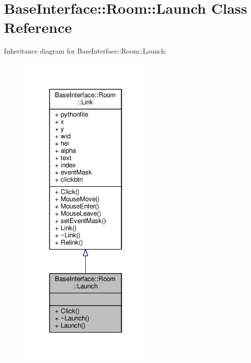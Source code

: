 \hypertarget{classBaseInterface_1_1Room_1_1Launch}{}\section{Base\+Interface\+:\+:Room\+:\+:Launch Class Reference}
\label{classBaseInterface_1_1Room_1_1Launch}


Inheritance diagram for Base\+Interface\+:\+:Room\+:\+:Launch\+:
\nopagebreak
\begin{figure}[H]
\begin{center}
\leavevmode
\includegraphics[width=190pt]{d8/d6a/classBaseInterface_1_1Room_1_1Launch__inherit__graph}
\end{center}
\end{figure}


